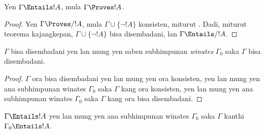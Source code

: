 \documentclass[../../../include/open-logic-section]{subfiles}
\begin{document}
\begin{cor}
Yen $\Gamma \Entails !A$, mula $\Gamma \Proves !A$.
\end{cor}

\begin{proof}
Yen $\Gamma\Proves/ !A$, mula $\Gamma \cup \{\lnot !A\}$ konsisten,
miturut . Dadi, miturut teorema kajangkepan,
$\Gamma \cup \{\lnot !A\}$ bisa disembadani, lan $\Gamma \Entails/ !A$.
\end{proof}

\begin{prop}
$\Gamma$ bisa disembadani yen lan mung yen saben subhimpunan
\emph{winates} $\Gamma_0$ saka $\Gamma$ bisa disembadani.
\end{prop}

\begin{proof}
$\Gamma$ ora bisa disembadani yen lan mung yen ora konsisten,
yen lan mung yen ana subhimpunan winates $\Gamma_0$ saka $\Gamma$
kang ora konsisten, yen lan mung yen ana subhimpunan winates
$\Gamma_0$ saka $\Gamma$ kang ora bisa disembadani.
\end{proof}

\begin{cor}
$\Gamma \Entails !A$ yen lan mung yen ana subhimpunan winates
$\Gamma_0$ saka $\Gamma$ kanthi $\Gamma_0 \Entails !A$.
\end{cor}
\end{document}
